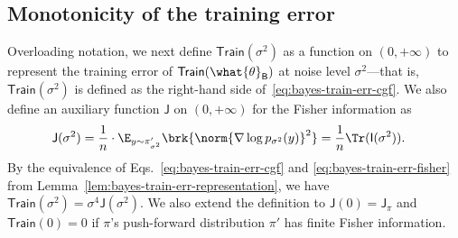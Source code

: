 \documentclass[11pt]{article}
\newcommand{\bysest}{\what{\theta}_{\mathsf{B}}}
\newcommand{\trerr}{\mathsf{Train}}
\newcommand{\tfunc}{\mathsf{Train}}
\newcommand{\jfunc}{\mathsf{J}}
\newcommand{\ifunc}{\mathsf{I}}
\begin{document}
\subsection{Monotonicity of the training error} \label{sec:monotonicity}

Overloading notation, we next define $\tfunc(\sigma^2)$ as a function on $(0, +\infty)$ to represent the training error of $\trerr(\bysest)$ at noise level $\sigma^2$---that is, $\tfunc(\sigma^2)$ is defined as the right-hand side of~\eqref{eq:bayes-train-err-cgf}. We also define an auxiliary function $\jfunc$ on $(0, +\infty)$ for the Fisher information as
\begin{align}
\jfunc(\sigma^2) & =  \frac{1}{n} \cdot  \E_{y \sim \pi'_{\sigma^2}} \brk{ \norm{\nabla \log  p_{\sigma^2}(y)}^2}  = \frac{1}{n} \Tr (\ifunc(\sigma^2)). \label{eq:jfunc}
\end{align}
By the equivalence of Eqs.~\eqref{eq:bayes-train-err-cgf} and \eqref{eq:bayes-train-err-fisher} from Lemma~\ref{lem:bayes-train-err-representation}, we have $\tfunc(\sigma^2) = \sigma^4 \jfunc(\sigma^2)$. We also extend the definition to $\jfunc(0) = \jfunc_{\pi}$ and $\tfunc(0) = 0$ if $\pi$'s push-forward distribution $\pi'$ has finite Fisher information. 
\end{document}
